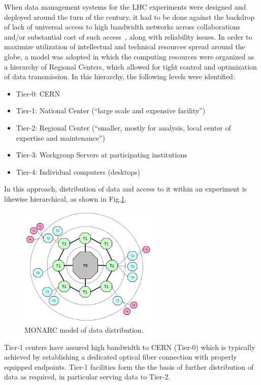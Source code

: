 When data management systems for the LHC experiments were designed and deployed around the turn of the century, it had to be done
against the backdrop of lack of universal access to high bandwidth networks across collaborations and/or substantial cost of such access~\cite{monarc},
along with reliability issues.
In order to maximize utilization of intellectual and technical resources spread around the globe, a model was adopted in which the computing resources
were organized as a hierarchy of Regional Centers, which allowed for tight control and optimization of data transmission. In this hierarchy, the following
levels were identified:
\begin{itemize}
\item Tier-0: CERN
\item Tier-1: National Center (``large scale and expensive facility'')
\item Tier-2: Regional Center (``smaller, mostly for analysis, local center of expertise and maintenance'')
\item Tier-3: Workgroup Servers at participating institutions
\item Tier-4: Individual computers (desktops)
\end{itemize}
\noindent
In this approach, distribution of data and access to it within an experiment is likewise hierarchical, as shown in Fig.\ref{fig:monarc}.
\begin{figure}[h!]
\centering
\includegraphics[width=0.6\textwidth]{monarc-model.png}
\caption{MONARC model of data distribution.}
\label{fig:monarc}
\end{figure}
Tier-1 centers have assured high bandwidth to CERN (Tier-0) which is typically achieved by establishing a dedicated
optical fiber connection with properly equipped endpoints. Tier-1 facilities form the the basis of further distribution of data
as required, in particular serving data to Tier-2.

